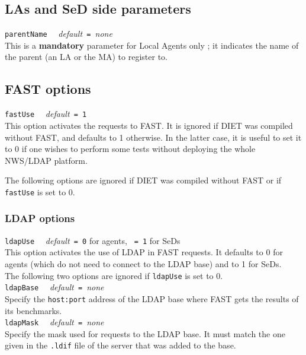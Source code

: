 \subsection{LAs and SeD side parameters}

\noindent
\texttt{parentName} \ \ \emph{default}\texttt{ = }\emph{none}\\
This is a \textbf{mandatory} parameter for Local Agents only ; it indicates the
name of the parent (an LA or the MA) to register to.


\subsection{FAST options}

\noindent
\texttt{fastUse} \ \ \emph{default}\texttt{ = 1}\\
This option activates the requests to FAST. It is ignored if DIET was
compiled without FAST, and defaults to 1 otherwise. In the latter case, it is
useful to set it to 0 if one wishes to perform some tests
without deploying the whole NWS/LDAP platform.

The following options are ignored if DIET was compiled without FAST or if
\texttt{fastUse} is set to 0.

\subsubsection{LDAP options}

\noindent
\texttt{ldapUse} \ \ \emph{default}\texttt{ = 0} for agents, \texttt{ = 1} for
SeDs\\
This option activates the use of LDAP in FAST requests. It defaults to 0 for
agents (which do not need to connect to the LDAP base) and to 1 for SeDs.
\\

The following two options are ignored if \texttt{ldapUse} is set to 0.
\\

\noindent
\texttt{ldapBase} \ \ \emph{default}\texttt{ = }\emph{none}\\
Specify the \texttt{host:port} address of the LDAP base where FAST gets the
results of its benchmarks.
\\

\noindent
\texttt{ldapMask} \ \ \emph{default}\texttt{ = }\emph{none}\\
Specify the mask used for requests to the LDAP base. It must match the one given
in the \texttt{.ldif} file of the server that was added to the base.


